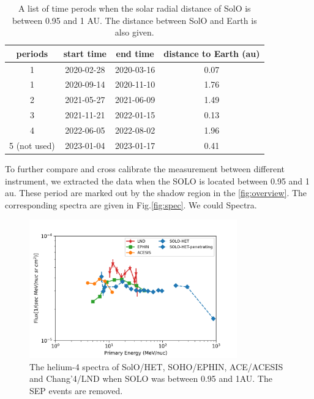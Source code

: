 \begin{table}[]
    \centering
	\caption[Time perods \ac{SolO} closed to 1 au]{A list of time perods when the solar radial distance of \ac{SolO} is between 0.95 and 1 AU. The distance between \ac{SolO} and Earth is also given.}
	\label{tab:1AU_period}
    \begin{tabular}{|c|c|c|c|}
    \hline
	periods & start time & end time & distance to Earth  (au)\\
    \hline
    1   & 2020-02-28 & 2020-03-16   & 0.07 \\
    \hline
	1	& 2020-09-14 & 2020-11-10	& 1.76 \\
    \hline
	2	& 2021-05-27 & 2021-06-09	& 1.49 \\
    \hline
	3	& 2021-11-21 & 2022-01-15	& 0.13 \\
    \hline
	4	& 2022-06-05 & 2022-08-02	& 1.96 \\
    \hline
    5 (not used)	& 2023-01-04 & 2023-01-17	& 0.41 \\
    \hline
    \end{tabular}
\end{table}


To further compare and cross calibrate the measurement between different instrument, we extracted the data when the SOLO is located between 0.95 and 1 au. These period are marked out by the shadow region in the \ref{fig:overview}. The corresponding spectra are given in Fig.\ref{fig:spec}. 
We could 
Spectra.

\begin{figure}
    \centering
    \includegraphics[width = 0.8\textwidth]{images/ACR/1AU_comparison_ACE_EPHIN_SOLO_SEP_version2.png}
    \caption[The helium spectra during the period \ac{SolO} between 0.95 and 1 au]{The helium-4 spectra of \ac{SolO}/\ac{HET}, \ac{SOHO}/\ac{EPHIN}, \ac{ACE}/\ac{ACESIS} and Chang'4/\ac{LND} when SOLO was between 0.95 and 1AU. The \ac{SEP} events are removed.}
    \label{fig:helium_spec_1au}
\end{figure}

